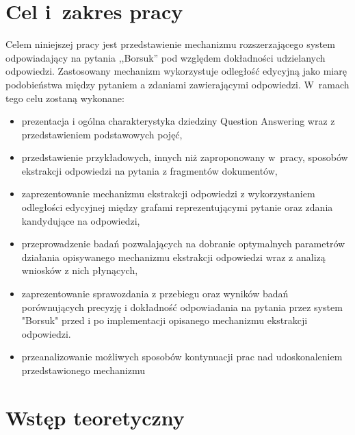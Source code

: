 \documentclass[a4paper, twoside, 12pt]{report}
\begin{document}
\tableofcontents

\listoffigures

\chapter{Cel i~zakres pracy}
    Celem niniejszej pracy jest przedstawienie mechanizmu rozszerzającego system odpowiadający na pytania ,,Borsuk''
    pod względem dokładności udzielanych odpowiedzi. Zastosowany mechanizm wykorzystuje odległość edycyjną jako miarę
    podobieństwa między pytaniem a zdaniami zawierającymi odpowiedzi. W~ramach tego celu zostaną wykonane:
    \begin{itemize}
        \item prezentacja i ogólna charakterystyka dziedziny Question Answering wraz z przedstawieniem podstawowych
            pojęć,
        \item przedstawienie przykładowych, innych niż zaproponowany w~pracy,
            sposobów ekstrakcji odpowiedzi na pytania z fragmentów dokumentów,
        \item zaprezentowanie mechanizmu ekstrakcji odpowiedzi z wykorzystaniem odległości edycyjnej między grafami
            reprezentującymi pytanie oraz zdania kandydujące na odpowiedzi,
        \item przeprowadzenie badań pozwalających na dobranie optymalnych parametrów działania opisywanego
            mechanizmu ekstrakcji odpowiedzi wraz z analizą wniosków z nich płynących,
       \item zaprezentowanie sprawozdania z przebiegu oraz wyników badań porównujących precyzję i dokładność
           odpowiadania na pytania przez system "Borsuk" przed i po implementacji opisanego mechanizmu ekstrakcji
           odpowiedzi.
       \item przeanalizowanie możliwych sposobów kontynuacji prac nad udoskonaleniem przedstawionego mechanizmu

    \end{itemize}

\chapter{Wstęp teoretyczny}
\clearpage
{}

%
\end{document}
